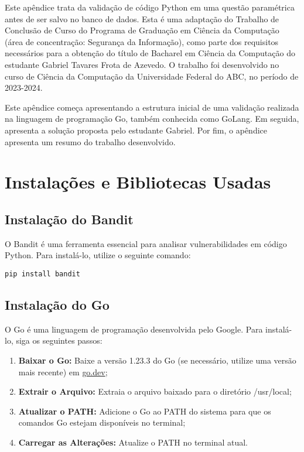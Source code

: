 \label{ch:apendiceD}

Este apêndice trata da validação de código Python em uma questão paramétrica antes de ser salvo no banco de dados. Esta é uma adaptação do Trabalho de Conclusão de Curso do Programa de Graduação em Ciência da Computação (área de concentração: Segurança da Informação), como parte dos requisitos necessários para a obtenção do título de Bacharel em Ciência da Computação do estudante Gabriel Tavares Frota de Azevedo. O trabalho foi desenvolvido no curso de Ciência da Computação da Universidade Federal do ABC, no período de 2023-2024. 

Este apêndice começa apresentando a estrutura inicial de uma validação realizada na linguagem de programação Go, também conhecida como GoLang. Em seguida, apresenta a solução proposta pelo estudante Gabriel. Por fim, o apêndice apresenta um resumo do trabalho desenvolvido.


\section{Instalações e Bibliotecas Usadas}

\subsection{Instalação do Bandit}
O Bandit é uma ferramenta essencial para analisar vulnerabilidades em código Python. Para instalá-lo, utilize o seguinte comando:

\begin{verbatim}
pip install bandit
\end{verbatim}

\subsection{Instalação do Go}
O Go é uma linguagem de programação desenvolvida pelo Google. Para instalá-lo, siga os seguintes passos:

\begin{enumerate}
    \item \textbf{Baixar o Go:} Baixe a versão 1.23.3 do Go (se necessário, utilize uma versão mais recente) em \href{https://go.dev/doc/install}{go.dev};
    \item \textbf{Extrair o Arquivo:} Extraia o arquivo baixado para o diretório /usr/local;
    \item \textbf{Atualizar o PATH:} Adicione o Go ao PATH do sistema para que os comandos Go estejam disponíveis no terminal;
    \item \textbf{Carregar as Alterações:} Atualize o PATH no terminal atual.
\end{enumerate}

